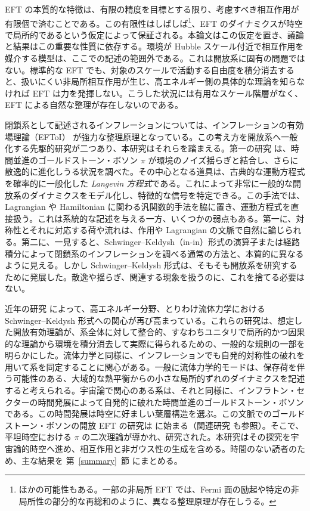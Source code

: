 \documentclass[a4paper,11pt]{ltjsarticle}
\numberwithin{equation}{section}
\newcommand{\Sec}[1]{Sec.~\ref{#1}}
\renewcommand{\Sec}[1]{第~\ref{#1}~節}
\begin{document}
EFT の本質的な特徴は、有限の精度を目標とする限り、考慮すべき相互作用が有限個で済むことである。この有限性はしばしば\footnote{ほかの可能性もある。一部の非局所 EFT では、Fermi 面の励起や特定の非局所性の部分的な再総和のように、異なる整理原理が存在しうる。}、EFT のダイナミクスが時空で局所的であるという仮定によって保証される。本論文はこの仮定を置き、議論と結果はこの重要な性質に依存する。環境が Hubble スケール付近で相互作用を媒介する模型は、ここでの記述の範囲外である。これは開放系に固有の問題ではない。標準的な EFT でも、対象のスケールで活動する自由度を積分消去すると、扱いにくい非局所相互作用が生じ、高エネルギー側の具体的な理論を知らなければ EFT は力を発揮しない。こうした状況には有用なスケール階層がなく、EFT による自然な整理が存在しないのである。

閉鎖系として記述されるインフレーションについては、インフレーションの有効場理論（EFToI）\cite{Cheung:2007st} が強力な整理原理となっている。この考え方を開放系へ一般化する先駆的研究が二つあり、本研究はそれらを踏まえる。第一の研究 \cite{LopezNacir:2011kk} は、時間並進のゴールドストーン・ボソン $\pi$ が環境のノイズ揺らぎと結合し、さらに散逸的に進化しうる状況を調べた。その中心となる道具は、古典的な運動方程式を確率的に一般化した \textit{Langevin 方程式}である。これによって非常に一般的な開放系のダイナミクスをモデル化し、特徴的な信号を特定できる。この手法では、Lagrangian や Hamiltonian に関わる汎関数的手法を脇に置き、運動方程式を直接扱う。これは系統的な記述を与える一方、いくつかの弱点もある。第一に、対称性とそれに対応する荷や流れは、作用や Lagrangian の文脈で自然に論じられる。第二に、一見すると、Schwinger--Keldysh（in-in）形式の演算子または経路積分によって閉鎖系のインフレーションを調べる通常の方法と、本質的に異なるように見える。しかし Schwinger--Keldysh 形式は、そもそも開放系を研究するために発展した。散逸や揺らぎ、関連する現象を扱うのに、これを捨てる必要はない。

近年の研究 \cite{Crossley:2015evo,Glorioso:2017fpd,Liu:2018kfw} によって、高エネルギー分野、とりわけ流体力学における Schwinger--Keldysh 形式への関心が再び高まっている。これらの研究は、想定した開放有効理論が、系全体に対して整合的、すなわちユニタリで局所的かつ因果的な理論から環境を積分消去して実際に得られるための、一般的な規則の一部を明らかにした。流体力学と同様に、インフレーションでも自発的対称性の破れを用いて系を同定することに関心がある。一般に流体力学的モードは、保存荷を伴う可能性のある、大域的な熱平衡からの小さな局所的ずれのダイナミクスを記述すると考えられる。宇宙論で関心のある系は、それと同様に、インフラトン・セクターの時間発展によって自発的に破れた時間並進のゴールドストーン・ボソンである。この時間発展は時空に好ましい葉層構造を選ぶ。この文脈でのゴールドストーン・ボソンの開放 EFT の研究は \cite{Hongo:2018ant} に始まる（関連研究 \cite{Hongo:2019qhi} も参照）。そこで、平坦時空における $\pi$ の二次理論が導かれ、研究された。本研究はその探究を宇宙論的時空へ進め、相互作用と非ガウス性の生成を含める。時間のない読者のため、主な結果を \Sec{summary} にまとめる。
\end{document}
